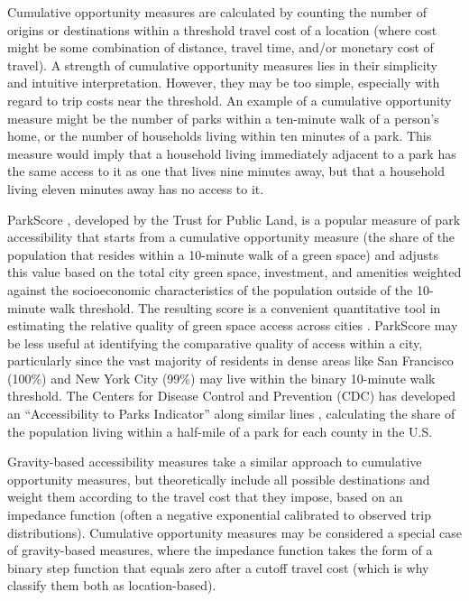 \documentclass[3p, authoryear, review]{elsarticle} %
\begin{document}
Cumulative opportunity measures are calculated by counting the number of origins
or destinations within a threshold travel cost of a location (where cost might
be some combination of distance, travel time, and/or monetary cost of travel). A
strength of cumulative opportunity measures lies in their simplicity and
intuitive interpretation. However, they may be too simple, especially with
regard to trip costs near the threshold. An example of a cumulative opportunity
measure might be the number of parks within a ten-minute walk of a person's
home, or the number of households living within ten minutes of a park. This
measure would imply that a household living immediately adjacent to a park has
the same access to it as one that lives nine minutes away, but that a household
living eleven minutes away has no access to it.

ParkScore \citep{parkscore2019}, developed by the Trust for Public Land, is a popular
measure of park accessibility that starts from a cumulative opportunity measure
(the share of the population that resides within a 10-minute walk of a green
space) and adjusts this value based on the total city green space, investment,
and amenities weighted against the socioeconomic characteristics of the
population outside of the 10-minute walk threshold. The resulting score is a
convenient quantitative tool in estimating the relative quality of green space
access across cities \citep{Rigolon2018}. ParkScore may be less useful at identifying the
comparative quality of access within a city, particularly since the vast majority
of residents in dense areas like San Francisco (100\%) and New York City (99\%)
may live within the binary 10-minute walk threshold. The Centers
for Disease Control and Prevention (CDC) has developed an ``Accessibility to
Parks Indicator'' along similar lines \citep{Ussery2016}, calculating the share of the
population living within a half-mile of a park for each county in the U.S.

Gravity-based accessibility measures take a similar approach to cumulative
opportunity measures, but theoretically include all possible destinations and
weight them according to the travel cost that they impose, based on an impedance
function (often a negative exponential calibrated to observed trip distributions).
Cumulative opportunity measures may be considered a special case of
gravity-based measures, where the impedance function takes the form of a binary
step function that equals zero after a cutoff travel cost (which is why
\citet{GEURS2004127} classify them both as location-based).
\end{document}
